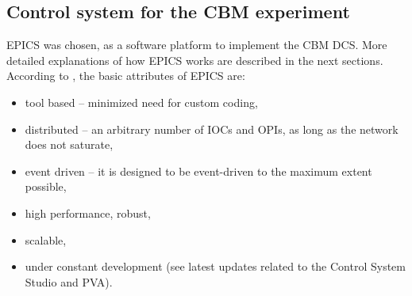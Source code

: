 



\subsection{Control system for the CBM experiment}
\gls{EPICS} was chosen, as a software platform to implement the \gls{CBM} \gls{DCS}. More detailed explanations of how \gls{EPICS} works are described in the next sections. According to \cite{EPICS_DOCS}, the basic attributes of \gls{EPICS} are:
\begin{itemize}
    \item tool based -- minimized need for custom coding,
    \item distributed -- an arbitrary number of \glspl{IOC} and \glspl{OPI}, as long as the network does not saturate,
    \item event driven -- it is designed to be event-driven to the maximum extent possible,
    \item high performance, robust,
    \item scalable,
    \item under constant development (see latest updates related to the Control System Studio and PVA).
\end{itemize}

